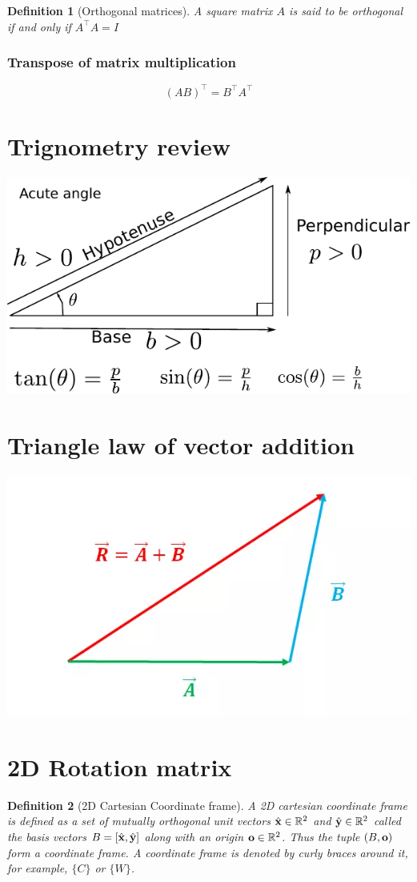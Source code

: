 \documentclass[twocolumn]{article}
\newtheorem{defn}{Definition}
\begin{document}
\begin{defn}[Orthogonal matrices]
  A square matrix $A$ is said to be orthogonal if and only if $A^\top A = I$
\end{defn}

\subsubsection{Transpose of matrix multiplication}
\[
  (AB)^\top = B^\top A^\top
  \]


\section{Trignometry review}
\includegraphics[width=\linewidth]{media/trig.pdf}

\section{Triangle law of vector addition}
\includegraphics[width=\linewidth]{media/triangle-law.png}

\section{2D  Rotation matrix}
\begin{defn}[2D  Cartesian Coordinate frame]
 A 2D cartesian coordinate  frame  is defined as a set of mutually orthogonal unit
 vectors  $\hat{\mathbf{x}} \in  \mathbb{R}^2$  and
 $\hat{\mathbf{y}}\in  \mathbb{R}^2 $ called the basis vectors $B = [\hat{\mathbf{x}}, \hat{\mathbf{y}}]$
 along  with  an origin  $\mathbf{o}\in  \mathbb{R}^2$. Thus the tuple  $(B, \mathbf{o})$ form a
 coordinate frame. A  coordinate  frame is denoted  by curly braces around it,
 for  example, $\{C\}$ or $\{W\}$.
\end{defn}
\end{document}
